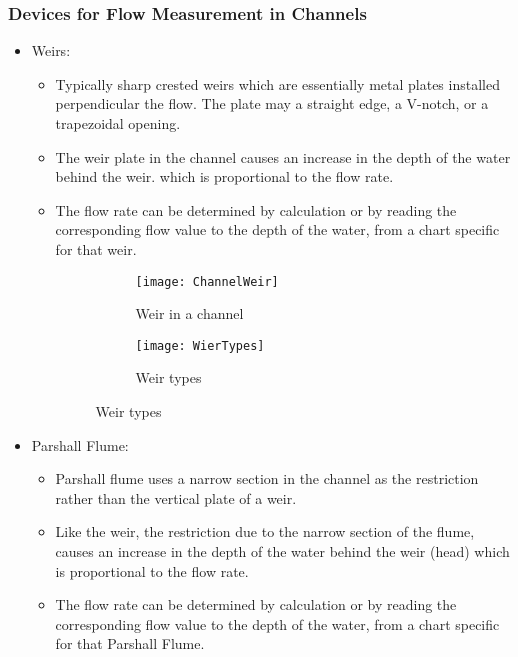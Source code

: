 		\subsubsection{Devices for Flow Measurement in Channels}

					\begin{itemize}
						\item Weirs: 
							\begin{itemize}
								\item Typically sharp crested weirs which are essentially metal plates installed perpendicular the flow.  The plate may a straight edge, a V-notch, or a trapezoidal opening.
								\item The weir plate in the channel causes an increase in the depth of the water behind the weir.  which is proportional to the flow rate.
								\item The flow rate can be determined by calculation or by reading the corresponding flow value to the depth of the water, from a chart specific for that weir. 
								
						
\begin{figure}[h!]
  \centering
  \begin{subfigure}[b]{0.4\linewidth}
    \texttt{[image: ChannelWeir]}
    \caption{Weir in a channel}
  \end{subfigure}
  \hspace{1cm}
  \begin{subfigure}[b]{0.4\linewidth}
    \texttt{[image: WierTypes]}
    \caption{Weir types}
  \end{subfigure}
\end{figure}
								
								
								
							\end{itemize}
						\item Parshall Flume:
							\begin{itemize}
								\item Parshall flume uses a narrow section in the channel as the restriction rather than the vertical plate of a weir.
								\item Like the weir, the restriction due to the narrow section of the flume, causes an increase in the depth of the water behind the weir (head) which is proportional to the flow rate.
								\item The flow rate can be determined by calculation or by reading the corresponding flow value to the depth of the water, from a chart specific for that Parshall Flume. 
								\end{itemize}

					\end{itemize}
